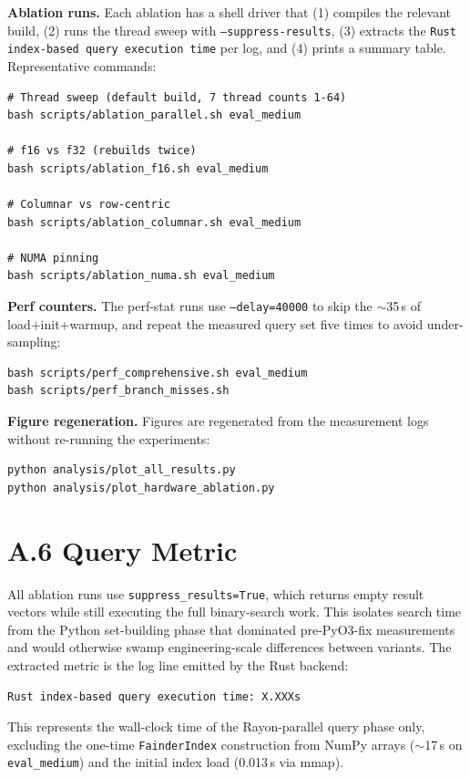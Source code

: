 \textbf{Ablation runs.} Each ablation has a shell driver that (1) compiles the relevant build, (2) runs the thread sweep with \texttt{--suppress-results}, (3) extracts the \texttt{Rust index-based query execution time} per log, and (4) prints a summary table. Representative commands:

\begin{verbatim}
# Thread sweep (default build, 7 thread counts 1-64)
bash scripts/ablation_parallel.sh eval_medium

# f16 vs f32 (rebuilds twice)
bash scripts/ablation_f16.sh eval_medium

# Columnar vs row-centric
bash scripts/ablation_columnar.sh eval_medium

# NUMA pinning
bash scripts/ablation_numa.sh eval_medium
\end{verbatim}

\textbf{Perf counters.} The perf-stat runs use \texttt{--delay=40000} to skip the $\sim$35\,s of load+init+warmup, and repeat the measured query set five times to avoid under-sampling:

\begin{verbatim}
bash scripts/perf_comprehensive.sh eval_medium
bash scripts/perf_branch_misses.sh
\end{verbatim}

\textbf{Figure regeneration.} Figures are regenerated from the measurement logs without re-running the experiments:

\begin{verbatim}
python analysis/plot_all_results.py
python analysis/plot_hardware_ablation.py
\end{verbatim}

\section*{A.6 Query Metric}

All ablation runs use \texttt{suppress\_results=True}, which returns empty result vectors while still executing the full binary-search work. This isolates search time from the Python set-building phase that dominated pre-PyO3-fix measurements and would otherwise swamp engineering-scale differences between variants. The extracted metric is the log line emitted by the Rust backend:

\begin{verbatim}
Rust index-based query execution time: X.XXXs
\end{verbatim}

This represents the wall-clock time of the Rayon-parallel query phase only, excluding the one-time \texttt{FainderIndex} construction from NumPy arrays ($\sim$17\,s on \texttt{eval\_medium}) and the initial index load (0.013\,s via mmap).
